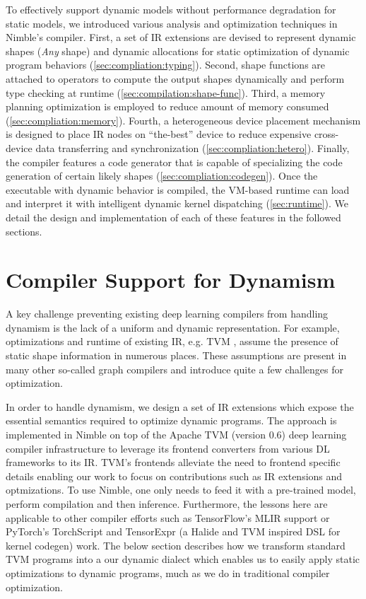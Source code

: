 To effectively support dynamic models without performance degradation for static models, we introduced various analysis and optimization techniques in Nimble's compiler.
First, a set of IR extensions are devised to represent dynamic shapes (\textit{Any} shape) and dynamic allocations for static optimization of dynamic program behaviors (\autoref{sec:compliation:typing}).
Second, shape functions are attached to operators to compute the output shapes dynamically and perform type checking at runtime (\autoref{sec:compilation:shape-func}).
Third, a memory planning optimization is employed to reduce amount of memory consumed (\autoref{sec:compliation:memory}).
Fourth, a heterogeneous device placement mechanism is designed to place IR nodes on ``the-best'' device to reduce expensive cross-device data transferring and synchronization (\autoref{sec:compliation:hetero}).
Finally, the compiler features a code generator that is capable of specializing the code generation of certain likely shapes (\autoref{sec:compliation:codegen}). Once the executable with dynamic behavior is compiled, the VM-based runtime can load and interpret it with intelligent dynamic kernel dispatching (\autoref{sec:runtime}). We detail the design and implementation of each of these features in the followed sections.

\section{Compiler Support for Dynamism}
\label{sec:nimble-compliation}

A key challenge preventing existing deep learning compilers from handling dynamism is the lack of a uniform and dynamic representation. For example, optimizations and runtime of existing IR, e.g. TVM \citep{tvm_osdi18}, assume the presence of static shape information in numerous places. These assumptions are present in many other so-called graph compilers and introduce quite a few challenges for optimization.

In order to handle dynamism, we design a set of IR extensions which expose the essential semantics required to optimize dynamic programs. The approach is implemented in Nimble on top of the Apache TVM (version 0.6) deep learning compiler infrastructure \citep{tvm_osdi18} to leverage its frontend converters from various DL frameworks to its IR. TVM's frontends alleviate the need to frontend specific details enabling our work to focus on contributions such as IR extensions and optmizations. To use Nimble, one only needs to feed it with a pre-trained model, perform compilation and then inference. Furthermore, the lessons
here are applicable to other compiler efforts such as TensorFlow's MLIR support or PyTorch's TorchScript and TensorExpr (a Halide and TVM inspired DSL for kernel codegen) work. The below section
describes how we transform standard TVM programs into a our dynamic dialect which enables us to easily apply static optimizations to dynamic programs, much as we do in traditional compiler optimization.

